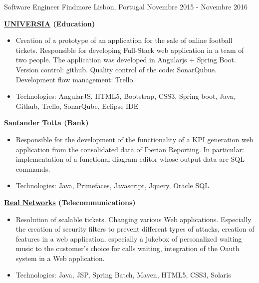 \begin{cventries}
\cventry
{Software Engineer} %
{Findmore} %
{Lisbon, Portugal} %
{Novembre 2015 - Novembre 2016} %
{ %
\begin{cvitems}
\item { \textbf{\href{http://www.universia.pt/}{UNIVERSIA} (Education)}}
\begin{itemize}
\item {Creation of a prototype of an application for the sale of online football tickets.
Responsible for developing Full-Stack web application in a team of two people. The application was developed in Angularjs + Spring Boot. Version control: github. Quality control of the code: SonarQubue. Development flow management: Trello.}
\item {Technologies: AngularJS, HTML5, Bootstrap, CSS3, Spring boot, Java, Github, Trello, SonarQube, Eclipse IDE}
\end{itemize}
\item { \textbf{\href{https://www.santandertotta.pt/pt_PT/Particulares.html}{Santander Totta} (Bank)}}
\begin{itemize}
\item {Responsible for the development of the functionality of a KPI generation web application from the consolidated data of Iberian Reporting. In particular: implementation of a functional diagram editor whose output data are SQL commands.}
\item {Technologies: Java, Primefaces, Javascript, Jquery, Oracle SQL}
\end{itemize}
\item { \textbf{\href{https://www.realnetworks.com/}{Real Networks} (Telecommunications)}}
\begin{itemize}
\item {Resolution of scalable tickets. Changing various Web applications. Especially the creation of security filters to prevent different types of attacks, creation of features in a web application, especially a jukebox of personalized waiting music to the customer's choice for calls waiting, integration of the Oauth system in a Web application.}
\item {Technologies: Java, JSP, Spring Batch, Maven, HTML5, CSS3,  Solaris}
\end{itemize}
\end{cvitems}
}



\end{cventries}
